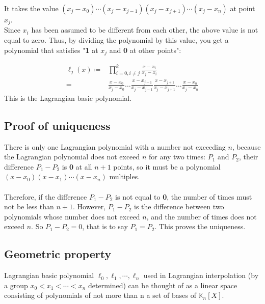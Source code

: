 \documentclass[12pt,a4paper]{article}
\begin{document}
\begin{spacing}{1.5}
\noindent It takes the value $(x_{j}-x_{0})\cdots (x_{j}-x_{{j-1}})(x_{j}-x_{{j+ 1}})\cdots (x_{j}-x_{{n}})$ at point $x_{j}$.\\

\noindent Since $x_{i}$ has been assumed to be different from each other, the above value is not equal to zero. Thus, by dividing the polynomial by this value, you get a polynomial that satisfies "\textbf{1} at $x_{j}$ and \textbf{0} at other points":

\begin{equation*}
\begin{aligned}
	\ell_j(x) \coloneqq &\prod_{i = 0,i \neq j}^k 
	\frac{x-x_i}{x_j-x_i} \\
	= &\frac{x-x_0}{x_j-x_0} \ldots
	\frac{x-x_{j-1}}{x_j-x_{j-1}}
	\frac{x-x_{j+1}}{x_j-x_{j+1}} \ldots
	\frac{x-x_n}{x_j-x_n}
\end{aligned}
\end{equation*}
\newline
\noindent This is the Lagrangian basic polynomial.

\newpage
\subsection{Proof of uniqueness}

There is only one Lagrangian polynomial with a number not exceeding $n$, because the Lagrangian polynomial does not exceed $n$ for any two times: 
$P_{1}$ and $P_{2}$, their difference $P_{1}-P_{ 2}$ is \textbf{0} at all $n+1$ points, so it must be a polynomial $(x-x_{0})(x-x_{{1}})\cdots (x-x_{{n}})$ multiples. \\\\
Therefore, if the difference $P_{1}-P_{2}$ is not equal to \textbf{0}, the number of times must not be less than $n+1$. However, $P_{1}-P_{2}$ is the difference between two polynomials whose number does not exceed $n$, and the number of times does not exceed $n$. So $P_{1}-P_{2}=0$, that is to say $P_{1}=P_{2}$. This proves the uniqueness.

\newpage
\subsection{Geometric property}

Lagrangian basic polynomial $\ell_{0}, \ell_{1}, \cdots, \ell_{n}$ used in Lagrangian interpolation (by a group $x_{0} < x_{1}< \cdots <x_{n}$ determined) can be thought of as a linear space consisting of polynomials of not more than n a set of bases of ${\mathbb {K}}_{n}[X]$.\\


\end{spacing}
\end{document}
